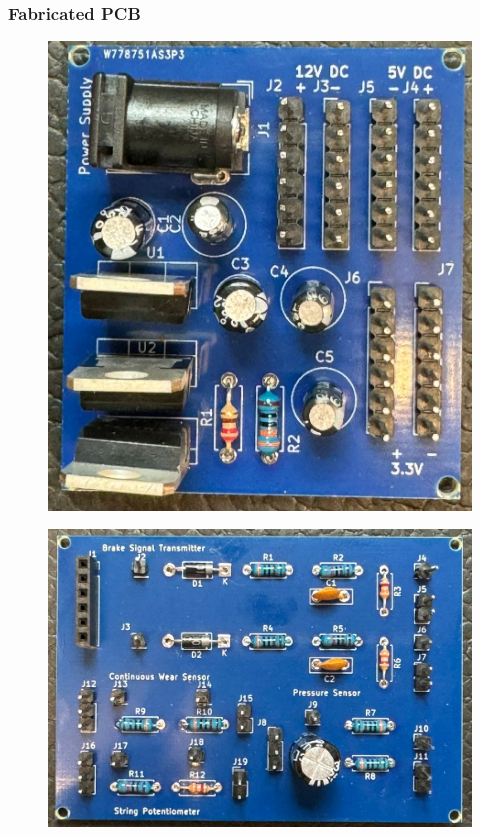 \documentclass[8pt,compress]{beamer}
\begin{document}
\begin{frame}
  \frametitle{Fabricated PCB}
  \begin{minipage}{0.5\textwidth}
    \begin{figure}
      \includegraphics[width=\textwidth]{assets/electronic/pcb1.jpeg}
    \end{figure}
  \end{minipage}
  \hfill
  \begin{minipage}{.475\textwidth}
  \begin{figure}
    \includegraphics[width=\textwidth]{assets/electronic/pcb2.jpeg}
  \end{figure}
  \end{minipage}
\end{frame}
\end{document}
